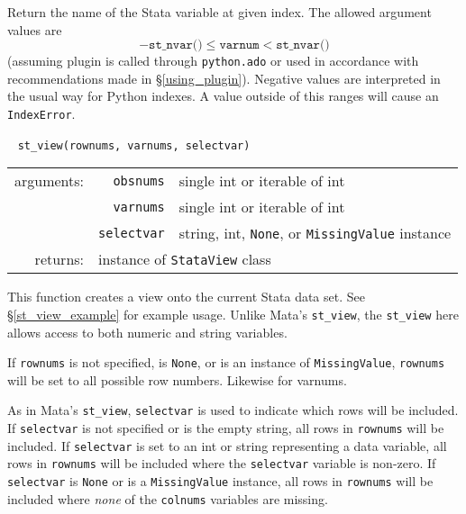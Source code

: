 \documentclass{article}
\begin{document}
			\vspace{1.5mm}
			\noindent Return the name of the Stata variable at given index. The allowed argument values are
			\[
				-\texttt{st\_nvar()} \leq \texttt{varnum} < \texttt{st\_nvar()}
			\]
			(assuming plugin is called through \lstinline$python.ado$ or used in accordance with recommendations made in \S\ref{using_plugin}). Negative values are interpreted in the usual way for Python indexes. A value outside of this ranges will cause an \lstinline$IndexError$. \newline
			
			
			\ \newline
			\noindent \lstinline$st_view(rownums, varnums, selectvar)$
								
			\vspace{1.5mm}
			\noindent
			\indent \begin{tabular}{rrl}
					arguments: & \texttt{obsnums} & single int or iterable of int \\
						& \texttt{varnums} & single int or iterable of int \\
						& \texttt{selectvar} & string, int, \lstinline$None$, or \lstinline$MissingValue$ instance \\
					returns: & \multicolumn{2}{l}{instance of \lstinline$StataView$ class}
				\end{tabular}
								
			\vspace{1.5mm}
			\noindent This function creates a view onto the current Stata data set. See \S\ref{st_view_example} for example usage. Unlike Mata's \lstinline{st_view}, the \lstinline{st_view} here allows access to both numeric and string variables. 
			
			If \lstinline{rownums} is not specified, is \lstinline{None}, or is an instance of \lstinline{MissingValue}, \lstinline{rownums} will be set to all possible row numbers. Likewise for varnums.
			
			As in Mata's \lstinline{st_view}, \lstinline{selectvar} is used to indicate which rows will be included. If \lstinline{selectvar} is not specified or is the empty string, all rows in \lstinline{rownums} will be included. If \lstinline{selectvar} is set to an int or string representing a data variable, all rows in \lstinline{rownums} will be included where the \lstinline{selectvar} variable is non-zero. If \lstinline{selectvar} is \lstinline{None} or is a \lstinline{MissingValue} instance, all rows in \lstinline{rownums} will be included where \emph{none} of the \lstinline{colnums} variables are missing. \newline
			
\end{document}
